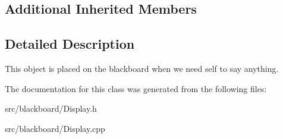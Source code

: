 \subsection*{Additional Inherited Members}


\subsection{Detailed Description}
This object is placed on the blackboard when we need self to say anything. 

The documentation for this class was generated from the following files\+:\begin{DoxyCompactItemize}
\item 
src/blackboard/Display.\+h\item 
src/blackboard/Display.\+cpp\end{DoxyCompactItemize}
